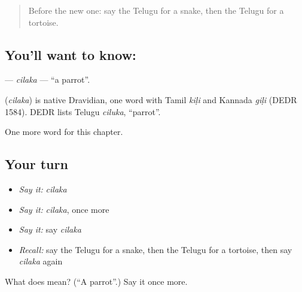\begin{quote}
Before the new one: say the Telugu for a snake, then the Telugu for a tortoise.
\end{quote}

\subsection*{You'll want to know: }
\textbf{} — \emph{cilaka} — \textquotedblleft{}a parrot\textquotedblright{}.

\begin{cousinweb}
\textbf{} (\emph{cilaka}) is native Dravidian, one word with Tamil \emph{kiḷi} and Kannada \emph{giḷi} (DEDR 1584). DEDR lists Telugu \emph{ciluka}, \textquotedblleft{}parrot\textquotedblright{}.
\end{cousinweb}

\begin{grammarlens}[title={What you've built}]
One more word for this chapter.
\end{grammarlens}

\subsection*{Your turn}
\begin{itemize}
\raggedright
  \item \emph{Say it:} \emph{cilaka}
  \item \emph{Say it:} \emph{cilaka}, once more
  \item \emph{Say it:} say \emph{cilaka}
  \item \emph{Recall:} say the Telugu for a snake, then the Telugu for a tortoise, then say \emph{cilaka} again
\end{itemize}

\begin{tcolorbox}[breakable,colback=teal!4,colframe=teal!35!black,title={Before you move on}]
What does  mean? (\textquotedblleft{}A parrot\textquotedblright{}.) Say it once more.
\end{tcolorbox}
